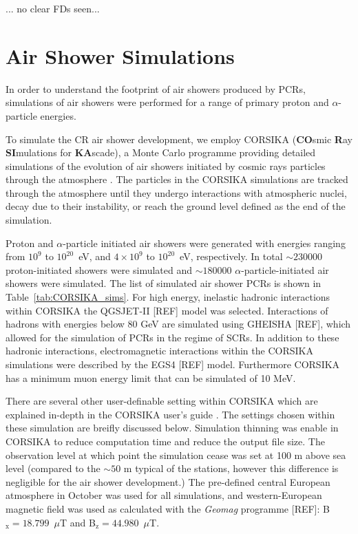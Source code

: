 ... no clear FDs seen...



\section{Air Shower Simulations}\label{sec:CORSIKA}

In order to understand the footprint of air showers produced by PCRs, simulations of air showers were performed for a range of primary proton and $\alpha$-particle energies.

To simulate the CR air shower development, we employ CORSIKA ({\bf CO}smic {\bf R}ay {\bf SI}mulations for {\bf KA}scade), a Monte Carlo programme providing detailed simulations of the evolution of air showers initiated by cosmic rays particles through the atmosphere \citep{heck_extensive_2017}. The particles in the CORSIKA simulations are tracked through the atmosphere until they undergo interactions with atmospheric nuclei, decay due to their instability, or reach the ground level defined as the end of the simulation.

Proton and $\alpha$-particle initiated air showers were generated with energies ranging from $10^{9}$ to $10^{20}$~eV, and $4\times10^{9}$ to $10^{20}$~eV, respectively. In total $\sim 230000$ proton-initiated showers were simulated and $\sim 180000$ $\alpha$-particle-initiated air showers were simulated. The list of simulated air shower PCRs is shown in Table~\ref{tab:CORSIKA_sims}. For high energy, inelastic hadronic interactions within CORSIKA the QGSJET-II [REF] model was selected. Interactions of hadrons with energies below 80 GeV are simulated using GHEISHA [REF], which allowed for the simulation of PCRs in the regime of SCRs. In addition to these hadronic interactions, electromagnetic interactions within the CORSIKA simulations were described by the EGS4 [REF] model. Furthermore CORSIKA has a minimum muon energy limit that can be simulated of 10 MeV.



There are several other user-definable setting within CORSIKA which are explained in-depth in the CORSIKA user's guide \citep{heck_extensive_2017}. The settings chosen within these simulation are breifly discussed below. Simulation thinning was enable in CORSIKA to reduce computation time and reduce the output file size. The observation level at which point the simulation cease was set at 100 m above sea level (compared to the $\sim 50$ m typical of the stations, however this difference is negligible for the air shower development.) The pre-defined central European atmosphere in October was used for all simulations, and western-European magnetic field was used as calculated with the \textit{Geomag} programme [REF]: B$_{\mathrm{x}}=18.799$~$\mu$T and B$_{\mathrm{z}}=44.980$~$\mu$T.


